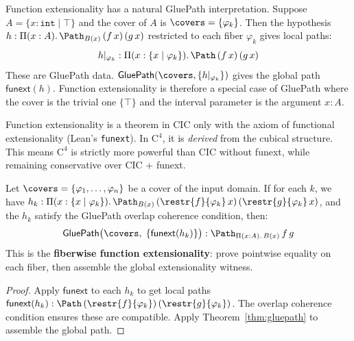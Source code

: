 \begin{remark}
Function extensionality has a natural GluePath interpretation.  Suppose
$A = \{x : \mathtt{int} \mid \top\}$ and the cover of $A$ is
$\covers = \{\varphi_k\}$.  Then the hypothesis
$h : \Pi(x : A).\, \Path_{B(x)}\, (f\,x)\, (g\,x)$ restricted to each
fiber $\varphi_k$ gives local paths:
\[
  h|_{\varphi_k} : \Pi(x : \{x \mid \varphi_k\}).\,
  \Path\,(f\,x)\,(g\,x)
\]
These are GluePath data.  $\mathsf{GluePath}(\covers, \{h|_{\varphi_k}\})$
gives the global path $\mathsf{funext}(h)$.  Function extensionality is
therefore a special case of GluePath where the cover is the trivial one
$\{\top\}$ and the interval parameter is the argument $x : A$.
\end{remark}

\begin{remark}
Function extensionality is a theorem in CIC only with the axiom of
functional extensionality (Lean's \texttt{funext}).  In $\mathrm{C}^4$,
it is \emph{derived} from the cubical structure.  This means
$\mathrm{C}^4$ is strictly more powerful than CIC without funext,
while remaining conservative over CIC + funext.
\end{remark}

\begin{corollary}
\label{cor:fiberwise-funext}
Let $\covers = \{\varphi_1, \ldots, \varphi_n\}$ be a cover of the
input domain.  If for each $k$, we have
$h_k : \Pi(x : \{x \mid \varphi_k\}).\, \Path_{B(x)}\,
(\restr{f}{\varphi_k}\,x)\, (\restr{g}{\varphi_k}\,x)$,
and the $h_k$ satisfy the GluePath overlap coherence condition, then:
\[
  \mathsf{GluePath}\bigl(\covers,\; \{\mathsf{funext}(h_k)\}\bigr)
  : \Path_{\Pi(x:A).\,B(x)}\, f\, g
\]
This is the \textbf{fiberwise function extensionality}: prove pointwise
equality on each fiber, then assemble the global extensionality witness.
\end{corollary}

\begin{proof}
Apply $\mathsf{funext}$ to each $h_k$ to get local paths
$\mathsf{funext}(h_k) : \Path\,(\restr{f}{\varphi_k})\,(\restr{g}{\varphi_k})$.
The overlap coherence condition ensures these are compatible.
Apply Theorem~\ref{thm:gluepath} to assemble the global path.
\end{proof}




